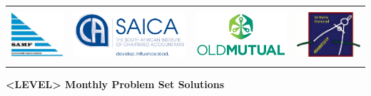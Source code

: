 \documentclass{article}
\begin{document}
\setlength{\tabcolsep}{6pt}
\begin{center} \begin{tabular}{cccc}
	\includegraphics[height=56pt]{SAMF_logo.jpg} &
	\includegraphics[height=56pt]{SAICA_logo.jpg} &
	\includegraphics[height=56pt]{OM_Logo_Stacked_Vignette_on_White_RGB.jpg} &
	\includegraphics[height=56pt]{SAMO2019.png}
\end{tabular} \end{center}


\bigskip


\begin{center}
	\textbf{\Large <LEVEL> Monthly Problem Set Solutions}
\end{center}
\end{document}
